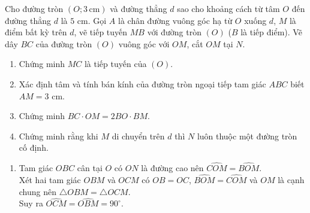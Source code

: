 \begin{bt}%
 Cho đường tròn $(O; 3 \mathrm{\,cm})$ và đường thẳng $d$ sao cho khoảng cách từ tâm $O$ đến đường thẳng $d$ là $5$ cm. Gọi $A$ là chân đường vuông góc hạ từ $O$ xuống $d$, $M$ là điểm bất kỳ trên $d$, vẽ tiếp tuyến $MB$ với đường tròn $(O)$ ($B$ là tiếp điểm). Vẽ dây $BC$ của đường tròn $(O)$ vuông góc với $OM$, cắt $OM$ tại $N$.
 \begin{enumerate}
  \item Chứng minh $MC$ là tiếp tuyến của $(O)$.
  \item Xác định tâm và tính bán kính của đường tròn ngoại tiếp tam giác $ABC$ biết $AM=3$ cm.
  \item Chứng minh $BC \cdot OM = 2BO \cdot BM$.
  \item Chứng minh rằng khi $M$ di chuyển trên $d$ thì $N$ luôn thuộc một đường tròn cố định.
 \end{enumerate}
 \loigiai
  {
  \begin{center}
  \end{center}
  \begin{enumerate}
   \item Tam giác $OBC$ cân tại $O$ có $ON$ là đường cao nên $\widehat{COM}=\widehat{BOM}$.\\
   Xét hai tam giác $OBM$ và $OCM$ có $OB=OC$, $\widehat{BOM}=\widehat{COM}$ và $OM$ là cạnh chung nên $\triangle OBM = \triangle OCM$.\\
   Suy ra $\widehat{OCM}=\widehat{OBM}=90^\circ$.\\

\end{enumerate}}
\end{bt}
